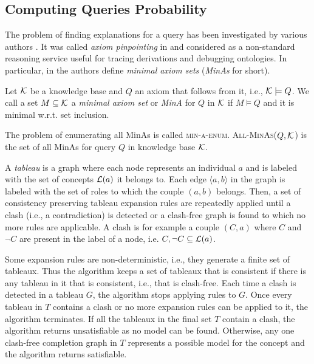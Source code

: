 \subsection{Computing Queries Probability}
The problem of finding  explanations for a query
has been investigated by various authors \cite{DBLP:conf/ijcai/SchlobachC03,DBLP:journals/ws/KalyanpurPSH05,DBLP:conf/semweb/KalyanpurPHS07,Kalyanpurphd,extended_tracing,Zese17-SSW-BK}.
It was called  \emph{axiom pinpointing} in 
\cite{DBLP:conf/ijcai/SchlobachC03}  and considered as a non-standard reasoning service useful for tracing derivations and debugging ontologies. 
In particular, in \cite{DBLP:conf/ijcai/SchlobachC03} the authors define \emph{minimal axiom sets}  (\emph{MinAs} for short).
\begin{definition}[MinA]
	Let ${\cal K}$ be a knowledge base and $Q$ an
	axiom that follows from it, i.e., 
	${\cal K} \models Q$. We call a set 
	$M\subseteq {\cal K}$ a
	\emph{minimal axiom set} or \emph{MinA} for $Q$ in ${\cal K}$ if 
	$M \models Q$ and it is minimal
	w.r.t. set inclusion.
\end{definition}  
\noindent The problem of enumerating all MinAs is called \textsc{min-a-enum}.
\textsc{All-MinAs($Q,{\cal K}$)} is the set of all MinAs for query $Q$ in knowledge base ${\cal K}$.

A \emph{tableau} is a graph where each node represents an
individual $a$ and is labeled with the set of concepts ${\cal L}(a)$ it belongs to. Each
edge $\langle a, b\rangle$ in the graph is labeled with the set of roles to which the couple
$(a, b)$ belongs. Then, a set of  consistency preserving tableau
expansion rules are repeatedly applied until a clash (i.e., a contradiction) is detected or a clash-free
graph is found to which no more rules are applicable. A clash is for example a
couple $(C, a)$ where $C$ and $\neg C$ are present in the label of a node, i.e. ${C, \neg C} \subseteq {\cal L}(a)$.

Some expansion rules are non-deterministic, i.e., they generate
a finite set of tableaux. Thus the algorithm keeps a set of tableaux that is
consistent if there is any tableau in it that is consistent, i.e., that is clash-free.
Each time a clash is detected in a tableau $G$, the algorithm stops applying rules
to $G$. Once every tableau in $T$ contains a clash or no more expansion rules
can be applied to it, the algorithm terminates. If all the tableaux in the final
set $T$ contain a clash, the algorithm returns unsatisfiable as no model can be
found. Otherwise, any one clash-free completion graph in $T$ represents a possible
model for the concept and the algorithm returns satisfiable.

